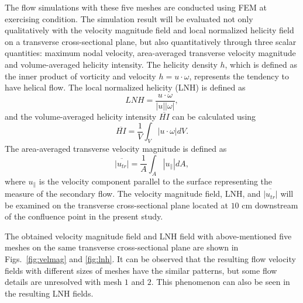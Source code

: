 The flow simulations with these five meshes are conducted using FEM at exercising condition. The simulation result will be evaluated not only qualitatively with the velocity magnitude field and local normalized helicity field on a transverse cross-sectional plane, but also quantitatively through three scalar quantities: maximum nodal velocity, area-averaged transverse velocity magnitude and volume-averaged helicity intensity. The helicity density $h$, which is defined as the inner product of vorticity and velocity $h=u\cdot\omega$, represents the tendency to have helical flow. The local normalized helicity (LNH) is defined as
\begin{equation}
LNH=\frac{u\cdot\omega}{\left|u\right|\left|\omega\right|},
\label{eq:LNH}
\end{equation}
and the volume-averaged helicity intensity $\overline{HI}$ can be calculated using
\begin{equation}
\overline{HI}=\frac{1}{V}\int_V \left|u\cdot\omega\right| dV.
\label{eq:HI}
\end{equation}
The area-averaged transverse velocity magnitude is defined as
\begin{equation}
\overline{\left|u_{tr}\right|}=\frac{1}{A}\int_A \left|u _\|\right| dA,
\label{eq:utr}
\end{equation}
where $u _\|$ is the velocity component parallel to the surface representing the measure of the secondary flow. The velocity magnitude field, LNH, and $\overline{\left|u_{tr}\right|}$ will be examined on the transverse cross-sectional plane located at $10$ cm downstream of the confluence point in the present study.  

The obtained velocity magnitude field and LNH field with above-mentioned five meshes on the same transverse cross-sectional plane are shown in Figs.~\ref{fig:velmag} and \ref{fig:lnh}. It can be observed that the resulting flow velocity fields with different sizes of meshes have the similar patterns, but some flow details are unresolved with mesh $1$ and $2$. This phenomenon can also be seen in the resulting LNH fields.


